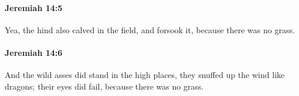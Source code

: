 		\paragraph{Jeremiah 14:5} %
			\label{JEREMIAH-14-5}

			Yea, the hind also calved in the field, and forsook it, because there was no grass.


		\paragraph{Jeremiah 14:6} %
			\label{JEREMIAH-14-6}

			And the wild asses did stand in the high places, they snuffed up the wind like dragons; their eyes did fail, because there was no grass.


